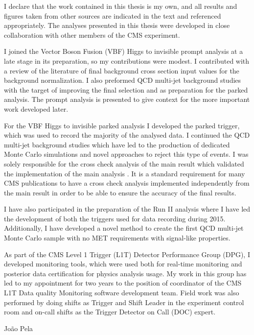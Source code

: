 \begin{declaration}
I declare that the work contained in this thesis is my own, and all results and figures taken from other sources are indicated in the text and referenced appropriately. The analyses presented in this thesis were developed in close collaboration with other members of the CMS experiment.

I joined the Vector Boson Fusion (VBF) Higgs to invisible prompt analysis at a late stage in its preparation, so my contributions were modest. I contributed with a review of the literature of final background cross section input values for the background normalization. I also preformed QCD multi-jet background studies with the target of improving the final selection and as preparation for the parked analysis. The prompt analysis is presented to give context for the more important work developed later. 

For the VBF Higgs to invisible parked analysis I developed the parked trigger, which was used to record the majority of the analysed data. I continued the QCD multi-jet background studies which have led to the production of dedicated Monte Carlo simulations and novel approaches to reject this type of events. I was solely responsible for the cross check analysis of the main result which validated the implementation of the main analysis \cite{ARTICLE:CMSVBFHiggsInvisibleParkedAnalysisPAS}. It is a standard requirement for many CMS publications to have a cross check analysis implemented independently from the main result in order to be able to ensure the accuracy of the final results. 

I have also participated in the preparation of the Run II analysis where I have led the development of both the triggers used for data recording during 2015. Additionally, I have developed a novel method to create the first QCD multi-jet Monte Carlo sample with no MET requirements with signal-like properties.

As part of the CMS Level 1 Trigger (L1T) Detector Performance Group (DPG), I developed monitoring tools, which were used both for real-time monitoring and posterior data certification for physics analysis usage. My work in this group has led to my appointment for two years to the position of coordinator of the \gls{CMS} \gls{L1T} Data quality Monitoring software development team. Field work was also performed by doing shifts as Trigger and Shift Leader in the experiment control room and on-call shifts as the Trigger Detector on Call (DOC) expert.
 
\vspace*{1cm}
\begin{flushright}
João Pela
\end{flushright}
\end{declaration}

